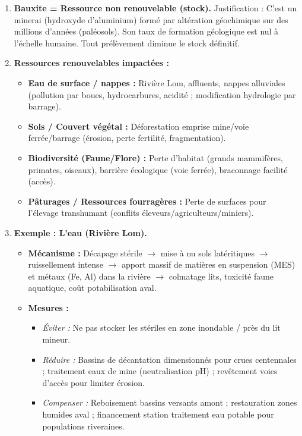 \documentclass[11pt]{article}
\begin{document}
\begin{corrige}
\begin{enumerate}
    \item \textbf{Bauxite = Ressource non renouvelable (stock).} Justification : C'est un minerai (hydroxyde d'aluminium) formé par altération géochimique sur des millions d'années (paléosols). Son taux de formation géologique est nul à l'échelle humaine. Tout prélèvement diminue le stock définitif.
    \item \textbf{Ressources renouvelables impactées :}
        \begin{itemize}
            \item \textbf{Eau de surface / nappes :} Rivière Lom, affluents, nappes alluviales (pollution par boues, hydrocarbures, acidité ; modification hydrologie par barrage).
            \item \textbf{Sols / Couvert végétal :} Déforestation emprise mine/voie ferrée/barrage (érosion, perte fertilité, fragmentation).
            \item \textbf{Biodiversité (Faune/Flore) :} Perte d'habitat (grands mammifères, primates, oiseaux), barrière écologique (voie ferrée), braconnage facilité (accès).
            \item \textbf{Pâturages / Ressources fourragères :} Perte de surfaces pour l'élevage transhumant (conflits éleveurs/agriculteurs/miniers).
        \end{itemize}
    \item \textbf{Exemple : L'eau (Rivière Lom).}
        \begin{itemize}
            \item \textbf{Mécanisme :} Décapage stérile $\rightarrow$ mise à nu sols latéritiques $\rightarrow$ ruissellement intense $\rightarrow$ apport massif de matières en suspension (MES) et métaux (Fe, Al) dans la rivière $\rightarrow$ colmatage lits, toxicité faune aquatique, coût potabilisation aval.
            \item \textbf{Mesures :}
                \begin{itemize}
                    \item \emph{Éviter :} Ne pas stocker les stériles en zone inondable / près du lit mineur.
                    \item \emph{Réduire :} Bassins de décantation dimensionnés pour crues centennales ; traitement eaux de mine (neutralisation pH) ; revêtement voies d'accès pour limiter érosion.
                    \item \emph{Compenser :} Reboisement bassins versants amont ; restauration zones humides aval ; financement station traitement eau potable pour populations riveraines.
                \end{itemize}
        \end{itemize}
\end{enumerate}
\end{corrige}
\end{document}
